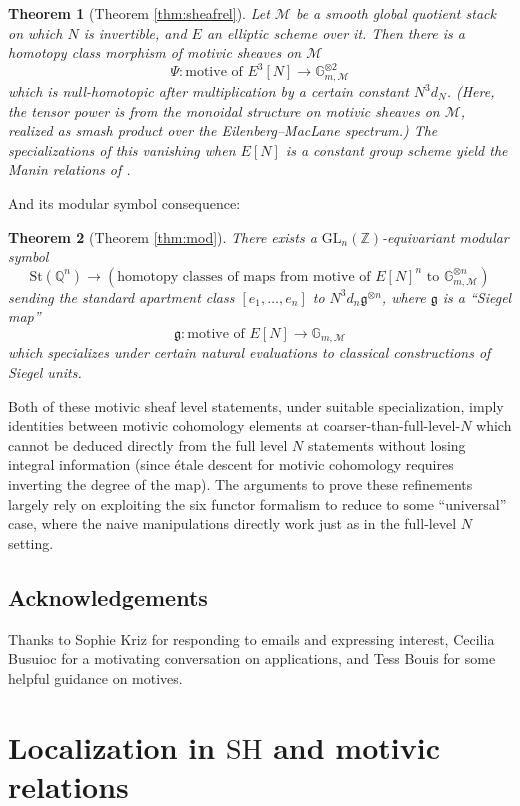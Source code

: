 \documentclass[a4paper,reqno,11pt]{amsart}
\theoremstyle{plain}
\newtheorem{theorem}{Theorem}[section]
\theoremstyle{definition}
\theoremstyle{remark}
\newcommand{\Z}{\mathbb{Z}}
\newcommand{\Q}{\mathbb{Q}}
\newcommand{\G}{\mathbb{G}}
\newcommand{\SH}{\mathrm{SH}}
\newcommand{\GL}{\mathrm{GL}}
\begin{document}
\begin{theorem}[Theorem \ref{thm:sheafrel}]
    Let $\mathcal{M}$ be a smooth global quotient stack on which $N$ is invertible, and $E$ an elliptic scheme over it. Then there is a homotopy class morphism of motivic sheaves on $\mathcal{M}$
    \[
    \Psi: \text{motive of }E^3[N] \to \G_{m,\mathcal{M}}^{\otimes 2}
    \]
    which is null-homotopic after multiplication by a certain constant $N^3 d_N$. (Here, the tensor power is from the monoidal structure on motivic sheaves on $\mathcal{M}$, realized as smash product over the Eilenberg--MacLane spectrum.) The specializations of this vanishing when $E[N]$ is a constant group scheme yield the Manin relations of \cite{BPPS}.
\end{theorem}
And its modular symbol consequence:

\begin{theorem}[Theorem \ref{thm:mod}]
    There exists a $\GL_n(\Z)$-equivariant modular symbol
    \[
    \mathrm{St}(\Q^n) \to (\text{homotopy classes of maps from motive of }E[N]^n\text{ to } \G_{m,\mathcal{M}}^{\otimes n})
    \]
    sending the standard apartment class $[e_1,\ldots, e_n]$ to $N^3 d_n\mathfrak{g}^{\otimes n}$, where $\mathfrak{g}$ is a ``Siegel map'' 
    \[
    \mathfrak{g}:\text{motive of }E[N] \to \G_{m,\mathcal{M}}
    \]
    which specializes under certain natural evaluations to classical constructions of Siegel units.
\end{theorem}

Both of these motivic sheaf level statements, under suitable specialization, imply identities between motivic cohomology elements at coarser-than-full-level-$N$ which cannot be deduced directly from the full level $N$ statements without losing integral information (since \'{e}tale descent for motivic cohomology requires inverting the degree of the map). The arguments to prove these refinements largely rely on exploiting the six functor formalism to reduce to some ``universal'' case, where the naive manipulations directly work just as in the full-level $N$ setting.

\subsection{Acknowledgements} Thanks to Sophie Kriz for responding to emails and expressing interest, Cecilia Busuioc for a motivating conversation on applications, and Tess Bouis for some helpful guidance on motives.

\section{Localization in $\SH$ and motivic relations}
\end{document}
